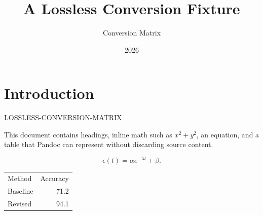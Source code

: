 \documentclass{article}
\title{A Lossless Conversion Fixture}
\author{Conversion Matrix}
\date{2026}
\begin{document}
\maketitle

\section{Introduction}
LOSSLESS-CONVERSION-MATRIX

This document contains headings, inline math such as $x^2 + y^2$, an
equation, and a table that Pandoc can represent without discarding source
content.

\begin{equation}
  \epsilon(t) = \alpha e^{-\lambda t} + \beta.
\end{equation}

\begin{table}[htbp]
  \centering
  \begin{tabular}{lr}
    Method & Accuracy \\
    Baseline & 71.2 \\
    Revised & 94.1 \\
  \end{tabular}
\end{table}
\end{document}
